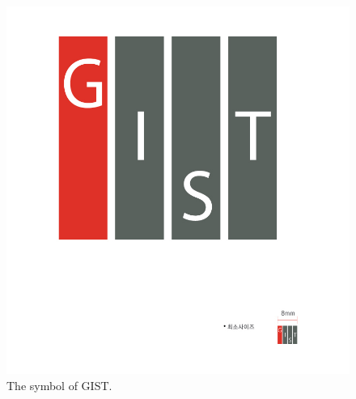 \begin{figure}
\centering
\includegraphics[scale=0.3]{imgs/gist.jpg}
\caption{The symbol of GIST.}
\label{fig:gist}
\end{figure}
